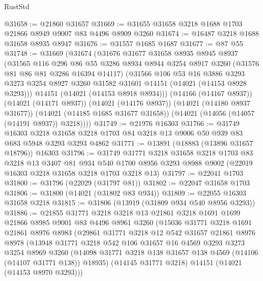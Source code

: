 \begin{lexlean}{RustStd}
\begin{coremodule}
@31658 := @21860 @31657
@31669 := @31655 @31658 @3218 @1688 @1703 @21866 @8949 @9007 @83 @4496 @8909 @3260
@31674 := @16487 @3218 @1688 @31658 @8935 @8947
@31676 := @31557 @1685 @1687
@31677 := @87 @55
@31748 := @31669
    (@31674
      (@31676
        @31677
        @31658
        @8935
        @8945
        @8937
        (@31565
          @116
          @296
          @86
          @55
          @3286
          @8934
          @8944
          @3254
          @8917
          @3260
          (@31576 @81 @86 @81 @3286 @16394 @14117)
          (@31566
            @106
            @53
            @16
            @3886
            @3293
            @3273
            @3254
            @8927
            @3260
            @31582
            @31601
            @14151
            (@14021 (@14153 @8928 @3293)))
          @14151
          (@14021 (@14153 @8918 @8934)))
        (@14166 (@14167 @8937))
        (@14021 (@14171 @8937))
        (@14021 (@14176 @8937))
        (@14021 (@14180 @8937 @31677))
        (@14021 (@14185 @1685 @31677 @31658))
        (@14021 (@14056 (@14057 (@14191 @8937)) @3218))))
@31749 := @21976 @16303
@31766 := @31749
    @16303
    @3218
    @31658
    @3218
    @1703
    @84
    @3218
    @13
    @9006
    @50
    @939
    @83
    @683
    @5948
    @3293
    @3293
    @4862
@31771 := @13891 (@18883 (@13896 @31657 @18796)) @16303
@31796 := @31749
    @31771
    @3218
    @31658
    @3218
    @1703
    @83
    @3218
    @13
    @3407
    @81
    @934
    @540
    @1700
    @8956
    @3293
    @8988
    @9002
    (@22019 @16303 @3218 @31658 @3218 @1703 @3218 @13)
@31797 := @22041 @1703
@31800 := @31796 (@22029 (@31797 @81))
@31802 := @22047 @31658 @1703
@31806 := @31800 (@14021 (@31802 @83 @934))
@31809 := @22055 @16303 @31658 @3218
@31815 := @31806 (@13919 (@31809 @934 @540 @8956 @3293))
@31886 := @21855
    @31771
    @3218
    @3218
    @13
    @21861
    @3218
    @1691
    @1699
    @21866
    @8985
    @9001
    @83
    @4496
    @8961
    @3260
    (@15036
      @31771
      @3218
      @1691
      @21861
      @8976
      @8983
      (@29861
        @31771
        @3218
        @12
        @542
        @31657
        @21861
        @8976
        @8978
        (@13948
          @31771
          @3218
          @542
          @106
          @31657
          @16
          @4569
          @3293
          @3273
          @3254
          @8969
          @3260
          (@14098 @31771 @3218 @138 @31657 @138 @4569 (@14106 (@14107 @31771 @138)) @18935)
          (@14145 @31771 @3218)
          @14151
          (@14021 (@14153 @8970 @3293)))

\end{coremodule}
\end{lexlean}
